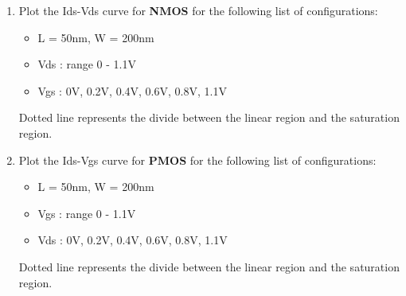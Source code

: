 \documentclass{article}
\begin{document}
\begin{enumerate}
    \item Plot the Ids-Vds curve for \textbf{NMOS} for the following list of configurations:
    \begin{itemize}
        \item L = 50nm, W = 200nm
        \item \vline Vds \vline : range 0 - 1.1V
        \item \vline Vgs \vline : 0V, 0.2V, 0.4V, 0.6V, 0.8V, 1.1V
    \end{itemize}
    \begin{center}
    \end{center}
    \begin{center}
        Dotted line represents the divide between the linear region and the saturation region.
    \end{center}
    \item Plot the Ids-Vgs curve for \textbf{PMOS} for the following list of configurations:
    \begin{itemize}
        \item L = 50nm, W = 200nm
        \item \vline Vgs \vline : range 0 - 1.1V
        \item \vline Vds \vline : 0V, 0.2V, 0.4V, 0.6V, 0.8V, 1.1V
    \end{itemize}
    \begin{center}
    \end{center}
    \begin{center}
        Dotted line represents the divide between the linear region and the saturation region.
    \end{center}
\end{enumerate}
\newpage
\end{document}
